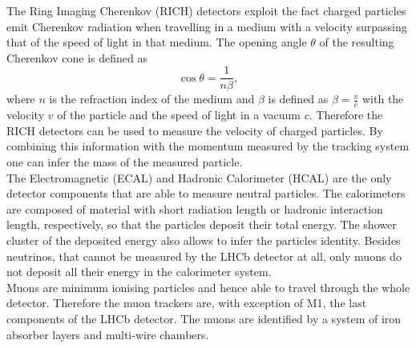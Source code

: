 The Ring Imaging Cherenkov (RICH) detectors exploit the fact charged particles emit Cherenkov radiation when travelling in a medium with a velocity surpassing that of the speed of light in that medium. The opening angle $\theta$ of the resulting Cherenkov cone is defined as
\begin{equation}
  \cos \theta = \frac{1}{n\beta},
\end{equation}
where $n$ is the refraction index of the medium and $\beta$ is defined as $\beta = \frac{v}{c}$ with the velocity $v$ of the particle and the speed of light in a vacuum $c$. Therefore the RICH detectors can be used to measure the velocity of charged particles. By combining this information with the momentum measured by the tracking system one can infer the mass of the measured particle.\\

The Electromagnetic (ECAL) and Hadronic Calorimeter (HCAL) are the only detector components that are able to measure neutral particles. The calorimeters are composed of material with short radiation length or hadronic interaction length, respectively, so that the particles deposit their total energy. The shower cluster of the deposited energy also allows to infer the particles identity. Besides neutrinos, that cannot be measured by the LHCb detector at all, only muons do not deposit all their energy in the calorimeter system.\\

Muons are minimum ionising particles and hence able to travel through the whole detector. Therefore the muon trackers are, with exception of M1, the last components of the LHCb detector. The muons are identified by a system of iron absorber layers and multi-wire chambers.
